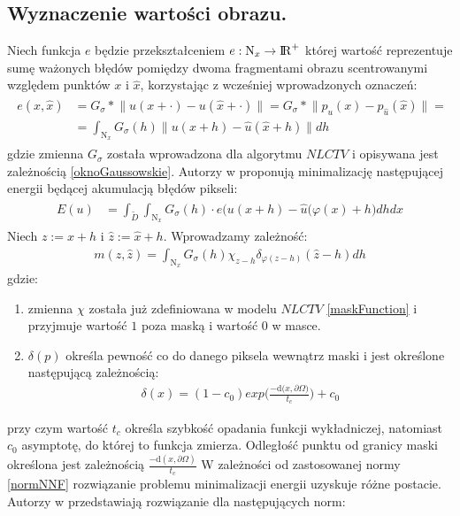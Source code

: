 \documentclass[12pt, twoside, openany]{report}
\theoremstyle{definition}
\begin{document}
\subsection{Wyznaczenie wartości obrazu.}
Niech funkcja $e$  będzie przekształceniem $e: \mathrm{N}_x \rightarrow {\rm I\!R}^{+}$ której wartość reprezentuje sumę ważonych błędów pomiędzy dwoma fragmentami obrazu scentrowanymi względem punktów $x$ i $\hat{x}$, korzystając z wcześniej wprowadzonych oznaczeń:
\begin{align}
\begin{aligned}
e(x, \hat{x}) &= G_\sigma \ast \big\| u(x + \cdot) - u(\hat{x} + \cdot) \big\| = G_\sigma \ast \big\| p_{u}(x) - p_{\hat{u}}(\hat{x}) \big\| = \\ 
&= \int_{\mathrm{N}_x} G_\sigma(h) \big\| u(x+h) - \hat{u}(\hat{x} +h) \big\|dh
\label{minUs}
\end{aligned}
\end{align}
gdzie zmienna $G_{\sigma}$ została wprowadzona dla algorytmu $NLCTV$ i opisywana jest zależnością \eqref{oknoGaussowskie}. Autorzy w \cite{arias2011variational} proponują minimalizację następującej energii będącej akumulacją błędów pikseli:
\begin{align}
\begin{aligned}
E(u) &= \int_{\widetilde D}\int_{\mathrm{N}_x}G_\sigma(h)\cdot e \bigl( u(x+h) - \hat{u}(\varphi(x)+h\bigr)dhdx
\label{patchMatchEnergy}
\end{aligned}
\end{align} 
Niech $z := x+h$ i $\hat{z} := \hat{x}+h$. Wprowadzamy zależność:
\begin{align}
m(z,\hat{z}) = \int_{\mathrm{N}_x}G_\sigma(h)\chi_{z-h}\delta_{\varphi(z-h)}(\hat{z}-h)dh
\end{align}
gdzie:
\begin{enumerate}
\item
zmienna $\chi$ została już zdefiniowana w modelu $NLCTV$ \eqref{maskFunction} i przyjmuje wartość $1$ poza maską i wartość $0$ w masce.
\item
$\delta(p)$ określa pewność co do danego piksela wewnątrz maski i jest określone następującą zależnością:
\begin{align}
\delta(x)=(1-c_0)exp\bigg(\frac{-\mathrm{d}\bigl(x,\partial\Omega\bigr)}{t_c}\bigg) + c_0
\label{pewnoscVFI}
\end{align}
\end{enumerate}
przy czym wartość $t_c$ określa szybkość opadania funkcji wykładniczej, natomiast $c_0$ asymptotę, do której to funkcja zmierza. Odległość punktu od granicy maski określona jest zależnością $\frac{-\mathrm{d}(x,\partial\Omega)}{t_c}$ W zależności od zastosowanej normy \eqref{normNNF} rozwiązanie problemu minimalizacji energii uzyskuje różne postacie. Autorzy w \cite{arias2011variational} przedstawiają rozwiązanie dla następujących norm:
\end{document}
